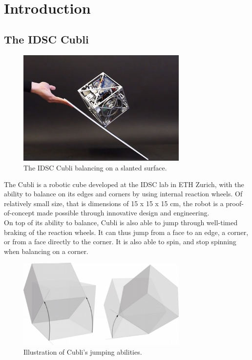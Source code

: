 \chapter{Introduction}\label{sec:introduction}

\section{The IDSC Cubli}\label{sec:cubli}

\begin{figure}[ht]
   \centering
   \includegraphics[width=0.75\textwidth]{img/Cubli.jpg}
   \caption{The IDSC Cubli balancing on a slanted surface.}
   \label{img:Cubli}
\end{figure}

The Cubli is a robotic cube developed at the IDSC lab in ETH Zurich, with the ability to balance on its edges and corners by using internal reaction wheels. Of relatively small size, that is dimensions of 15 x 15 x 15 cm, the robot is a proof-of-concept made possible through innovative design and engineering.\\

On top of its ability to balance, Cubli is also able to jump through well-timed braking of the reaction wheels. It can thus jump from a face to an edge, a corner, or from a face directly to the corner. It is also able to spin, and stop spinning when balancing on a corner.

\begin{figure}[ht]
   \centering
   \includegraphics[width=0.75\textwidth]{img/Jumps.png}
   \caption{Illustration of Cubli's jumping abilities.}
   \label{img:Jumps}
\end{figure}

